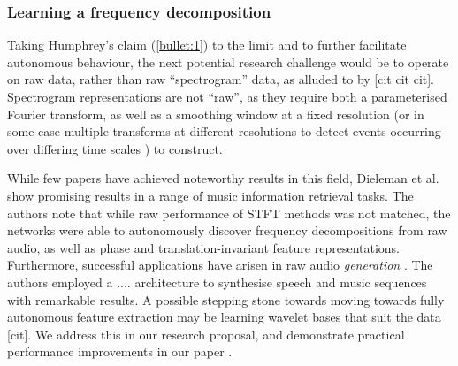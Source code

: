 \documentclass[12pt]{llncs}
\begin{document}

	




\subsubsection{Learning a frequency decomposition}

Taking Humphrey's claim (\ref{bullet:1}) to the limit and to further facilitate autonomous behaviour, the next potential research challenge would be to operate on raw data, rather than raw ``spectrogram'' data, as alluded to by [cit cit cit]. Spectrogram representations are not ``raw'', as they require both a parameterised Fourier transform, as well as a smoothing window at a fixed resolution (or in some case multiple transforms at different resolutions to detect events occurring over differing time scales \cite{espi2015exploiting}) to construct.

While few papers have achieved noteworthy results in this field, Dieleman et al. \cite{dieleman2014end} show promising results in a range of music information retrieval tasks. The authors note that while raw performance of STFT methods was not matched, the networks were able to autonomously discover frequency decompositions from raw audio, as well as phase and translation-invariant feature representations. Furthermore, successful applications have arisen in raw audio \emph{generation} \cite{van2016wavenet}. The authors employed a .... architecture to synthesise speech and music sequences with remarkable results. A possible stepping stone towards moving towards fully autonomous feature extraction may be learning wavelet bases that suit the data [cit]. We address this in our research proposal, and demonstrate practical performance improvements in our paper \cite[Section 5]{kiskin2017mosquito}.
\end{document}
